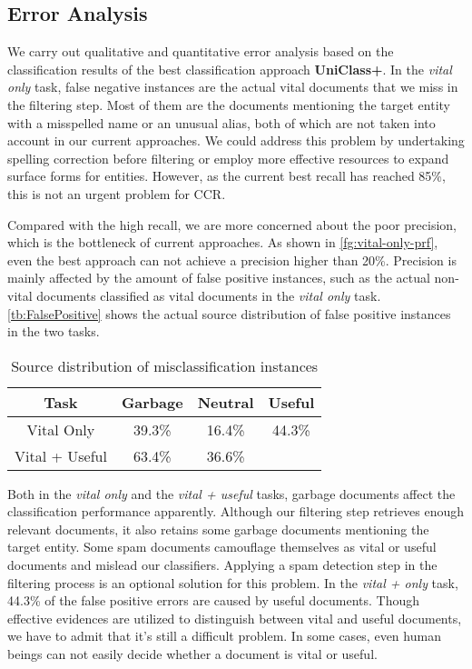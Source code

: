 \documentclass{sig-alternate}
\begin{document}
\subsection{Error Analysis}
We carry out qualitative and quantitative error analysis based on the classification results of the best classification approach \textbf{UniClass+}. In the \textit{vital only} task, false negative instances are the actual vital documents that we miss in the filtering step. Most of them are the documents mentioning the target entity with a misspelled name or an unusual alias, both of which are not taken into account in our current approaches. We could address this problem by undertaking spelling correction before filtering or employ more effective resources to expand surface forms for entities. However, as the current best recall has reached 85\%, this is not an urgent problem for CCR.

Compared with the high recall, we are more concerned about the poor precision, which is the bottleneck of current approaches. As shown in \autoref{fg:vital-only-prf}, even the best approach can not achieve a precision higher than 20\%. Precision is mainly affected by the amount of false positive instances, such as the actual non-vital documents classified as vital documents in the \textit{vital only} task. \autoref{tb:FalsePositive} shows the actual source distribution of false positive instances in the two tasks.
\begin{table}[thbp]
\centering
\caption{Source distribution of misclassification instances}\label{tb:FalsePositive}
\begin{tabular}{cccc} \hline
 Task & Garbage & Neutral & Useful  \\ \hline
 Vital Only & 39.3\% & 16.4\% & 44.3\%  \\ \hline
 Vital + Useful & 63.4\% & 36.6\% & \backslashbox{}{} \\ \hline
\end{tabular}
\end{table}
Both in the \textit{vital only} and the \textit{vital + useful} tasks, garbage documents affect the classification performance apparently. Although our filtering step retrieves enough relevant documents, it also retains some garbage documents mentioning the target entity. Some spam documents camouflage themselves as vital or useful documents and mislead our classifiers. Applying a spam detection step in the filtering process is an optional solution for this problem. In the \textit{vital + only} task, 44.3\% of the false positive errors are caused by useful documents. Though effective evidences are utilized to distinguish between vital and useful documents, we have to admit that it's still a difficult problem. In some cases, even human beings can not easily decide whether a document is vital or useful.
\end{document}
